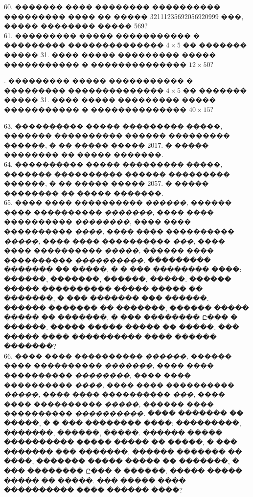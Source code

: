 \documentclass[12pt]{article}
\begin{document}
60. ������� ���� �������� ���������� ��������� ���� �� ����� 32111235692056920999 ���, ����� �������� ����� 569?\\
61. ��������� ����� ����������� � ��������� �������������� $4\times5$ �� ������� ����� 31. ���� ����� ��������� ����� ����������� � �������������� $12\times50?$
\begin{center}
\begin{figure}[ht!]
\end{figure}
\end{center}
\newpage
{}. ��������� ����� ����������� � ��������� �������������� $4\times5$ �� ������� ����� 31. ���� ����� ��������� ����� ����������� � �������������� $40\times15?$
\begin{center}
\begin{figure}[ht!]
\end{figure}
\end{center}
63. ���������� ����� ��������� �����, ������� ���������� ������ ��������� ������, � �� ����� ����� 2017. � ����� �������� �� ����� �������.\\
64. ���������� ����� ��������� �����, ������� ���������� ������ ��������� ������, � �� ����� ����� 2057. � ����� �������� �� ����� �������.\\
65. ���� ���� ���������� {\it ������,} ������ ���� ���������� {\it �������,} ���� ���� ���������� {\it ��������,} ���� ���� ���������� {\it ����,} ���� ���� ���������� {\it �����,} ���� ���� ���������� {\it ���,} ���� ���� ���������� {\it �����,} ������ ���� ���������� {\it ����������.} ��������� ������� �� �����, � � ��� �������� ����: ������, �������, ������, �����. ������ ����� ���������� ����� ����� �� �������, � ��� ������� ��� ������. ������ ������� �� �������, ������ ����� ����� �� �������, � ��� �������� Ը��� � ������. ����� ����� ����� �� �����. ��� ����� ���� ���������� ���� ������ �������?\\
66.  ���� ���� ���������� {\it ������,} ������ ���� ���������� {\it �������,} ���� ���� ���������� {\it ��������,} ���� ���� ���������� {\it ����,} ���� ���� ���������� {\it �����,} ���� ���� ���������� {\it ���,} ���� ���� ���������� {\it �����,} ������ ���� ���������� {\it ����������.} ���� ������� �� �����, � � ��� �������� ����: ���������, �������, ������, �����. ������ ����� ���������� ����� ����� �� �����, � ��� ������� ��� �������. ������ ������� �� ����, ������� ����� ����� �� �������, � ��� �������� Ը��� � ������. ����� ����� ����� �� �����. ��� ����� ���� ���������� ���� ������ ����?\\
\end{document}
